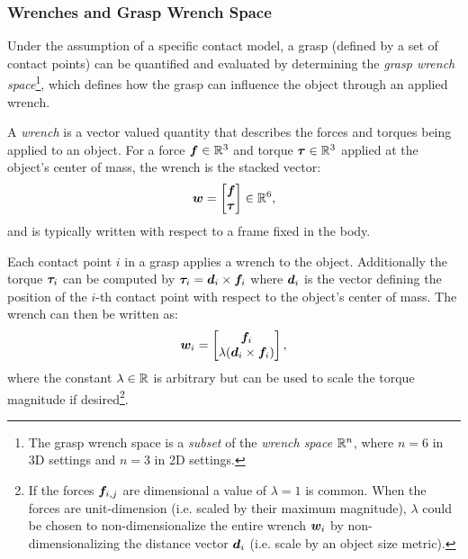 \subsubsection{Wrenches and Grasp Wrench Space}
Under the assumption of a specific contact model, a grasp (defined by a set of contact points) can be quantified and evaluated by determining the \textit{grasp wrench space}\footnote{The grasp wrench space is a \textit{subset} of the \textit{wrench space} $\mathbb{R}^n$, where $n = 6$ in 3D settings and $n=3$ in 2D settings.}, which defines how the grasp can influence the object through an applied wrench.
\begin{definition}[Wrench]
A \textit{wrench} is a vector valued quantity that describes the forces and torques being applied to an object. For a force $\bm{f} \in \mathbb{R}^3$ and torque $\bm{\tau} \in \mathbb{R}^3$ applied at the object's center of mass, the wrench is the stacked vector: 
\begin{equation*}
    \bm{w} = \begin{bmatrix}
    \bm{f} \\ \bm{\tau}
    \end{bmatrix} \in \mathbb{R}^6,
\end{equation*}
and is typically written with respect to a frame fixed in the body. 
\end{definition}
Each contact point $i$ in a grasp applies a wrench to the object. Additionally the torque $\bm{\tau}_i$ can be computed by $\bm{\tau}_i = \bm{d}_i \times \bm{f}_i$ where $\bm{d}_i$ is the vector defining the position of the $i$-th contact point with respect to the object's center of mass.
The wrench can then be written as:
\begin{equation} \label{eq:contactwrench}
    \bm{w}_i = \begin{bmatrix}
    \bm{f}_i \\ \lambda(\bm{d}_i \times \bm{f}_i)
    \end{bmatrix},
\end{equation}
where the constant $\lambda \in \mathbb{R}$ is arbitrary but can be used to scale the torque magnitude if desired\footnote[][-4\baselineskip]{If the forces $\bm{f}_{i,j}$ are dimensional a value of $\lambda=1$ is common. When the forces are unit-dimension (i.e. scaled by their maximum magnitude), $\lambda$ could be chosen to non-dimensionalize the entire wrench $\bm{w}_i$ by non-dimensionalizing the distance vector $\bm{d}_i$ (i.e. scale by an object size metric).}. 

